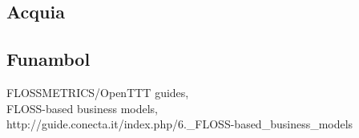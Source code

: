 \documentclass[11pt]{scrartcl}
\begin{document}
\subsection{Acquia}



\subsection{Funambol}



\begin{thebibliography}{9}

    FLOSSMETRICS/OpenTTT guides,\\
    FLOSS-based business models,\\
    http://guide.conecta.it/index.php/6.\_FLOSS-based\_business\_models
    
\end{thebibliography}
\end{document}
